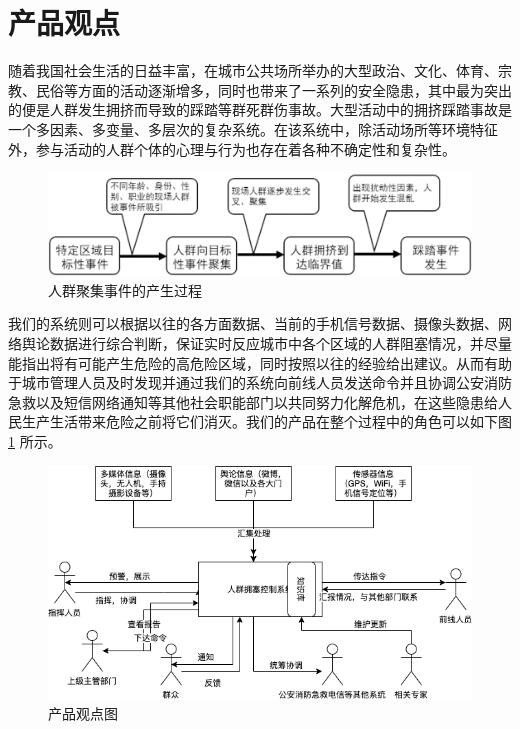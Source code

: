\documentclass{ctexrep}
\begin{document}
\section{产品观点}
随着我国社会生活的日益丰富，在城市公共场所举办的大型政治、文化、体育、宗教、民俗等方面的活动逐渐增多，同时也带来了一系列的安全隐患，其中最为突出的便是人群发生拥挤而导致的踩踏等群死群伤事故。大型活动中的拥挤踩踏事故是一个多因素、多变量、多层次的复杂系统。在该系统中，除活动场所等环境特征外，参与活动的人群个体的心理与行为也存在着各种不确定性和复杂性。
\begin{figure}[H]
	\centering
	\includegraphics[scale=0.2]{img/stages.png}
	\caption{人群聚集事件的产生过程}
\end{figure}
我们的系统则可以根据以往的各方面数据、当前的手机信号数据、摄像头数据、网络舆论数据进行综合判断，保证实时反应城市中各个区域的人群阻塞情况，并尽量能指出将有可能产生危险的高危险区域，同时按照以往的经验给出建议。从而有助于城市管理人员及时发现并通过我们的系统向前线人员发送命令并且协调公安消防急救以及短信网络通知等其他社会职能部门以共同努力化解危机，在这些隐患给人民生产生活带来危险之前将它们消灭。我们的产品在整个过程中的角色可以如下图 \ref{fig:function} 所示。
\begin{figure}[H]
	\centering
	\includegraphics[scale=0.4]{img/function.png}
	\caption{\label{fig:function} 产品观点图}
\end{figure}
\end{document}
